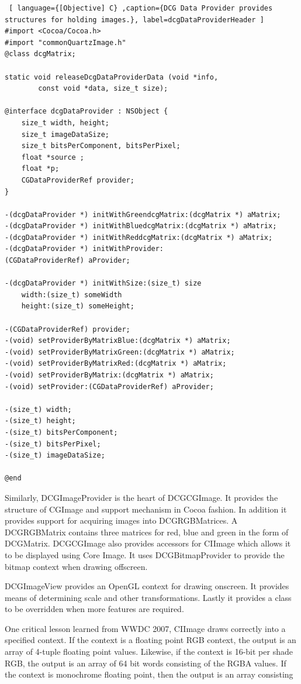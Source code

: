 \documentclass[12pt]{report}
\begin{document}
\begin{lstlisting} [ language={[Objective] C} ,caption={DCG Data Provider provides structures for holding images.}, label=dcgDataProviderHeader ] 
#import <Cocoa/Cocoa.h>
#import "commonQuartzImage.h"
@class dcgMatrix;

static void releaseDcgDataProviderData (void *info,
		const void *data, size_t size);

@interface dcgDataProvider : NSObject {
	size_t width, height;
	size_t imageDataSize;
	size_t bitsPerComponent, bitsPerPixel;
	float *source ;
	float *p;
	CGDataProviderRef provider;
}

-(dcgDataProvider *) initWithGreendcgMatrix:(dcgMatrix *) aMatrix;
-(dcgDataProvider *) initWithBluedcgMatrix:(dcgMatrix *) aMatrix;
-(dcgDataProvider *) initWithReddcgMatrix:(dcgMatrix *) aMatrix;
-(dcgDataProvider *) initWithProvider: 
(CGDataProviderRef) aProvider;

-(dcgDataProvider *) initWithSize:(size_t) size
	width:(size_t) someWidth
	height:(size_t) someHeight;

-(CGDataProviderRef) provider;
-(void) setProviderByMatrixBlue:(dcgMatrix *) aMatrix;
-(void) setProviderByMatrixGreen:(dcgMatrix *) aMatrix;
-(void) setProviderByMatrixRed:(dcgMatrix *) aMatrix;
-(void) setProviderByMatrix:(dcgMatrix *) aMatrix;
-(void) setProvider:(CGDataProviderRef) aProvider;

-(size_t) width;
-(size_t) height;
-(size_t) bitsPerComponent;
-(size_t) bitsPerPixel;
-(size_t) imageDataSize;

@end

\end{lstlisting}


Similarly, DCGImageProvider is the heart of DCGCGImage.  It provides the structure of CGImage and support mechanism in Cocoa fashion.  In addition it provides support for acquiring images into DCGRGBMatrices.   A DCGRGBMatrix contains three matrices for red, blue and green in the form of DCGMatrix.   DCGCGImage also provides accessors for CIImage which allows it to be displayed using Core Image.  It uses DCGBitmapProvider to provide the bitmap context when drawing offscreen.  

DCGImageView provides an OpenGL context for drawing onscreen.  It provides means of determining scale and other transformations.  Lastly it provides a class to be overridden when more features are required.  

One critical lesson learned from WWDC 2007, CIImage draws correctly into a specified context.  If the context is a floating point RGB context, the output is an array of 4-tuple floating point values.  Likewise, if the context is 16-bit per shade RGB, the output is an array of 64 bit words consisting of the RGBA values.   If the context is monochrome floating point, then the output is an array consisting 
\end{document}
